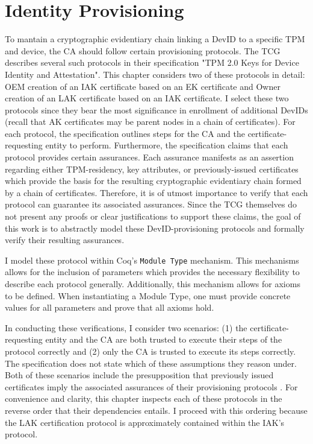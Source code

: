 \chapter{Identity Provisioning}



To mantain a cryptographic evidentiary chain linking a DevID to a specific TPM and device, the CA should follow certain provisioning protocols. The TCG describes several such protocols in their specification "TPM 2.0 Keys for Device Identity and Attestation". This chapter considers two of these protocols in detail: OEM creation of an IAK certificate based on an EK certificate and Owner creation of an LAK certificate based on an IAK certificate. I select these two protocols since they bear the most significance in enrollment of additional DevIDs (recall that AK certificates may be parent nodes in a chain of certificates). For each protocol, the specification outlines steps for the CA and the certificate-requesting entity to perform.
Furthermore, the specification claims that each protocol provides certain assurances. Each assurance manifests as an assertion regarding either TPM-residency, key attributes, or previously-issued certificates which provide the basis for the resulting cryptographic evidentiary chain formed by a chain of certificates. Therefore, it is of utmost importance to verify that each protocol can guarantee its associated assurances.
Since the TCG themselves do not present any proofs or clear justifications to support these claims, the goal of this work is to abstractly model these DevID-provisioning protocols and formally verify their resulting assurances.


I model these protocol within Coq's \verb|Module Type| mechanism. This mechanisms allows for the inclusion of parameters which provides the necessary flexibility to describe each protocol generally. Additionally, this mechanism allows for axioms to be defined. When instantiating a Module Type, one must provide concrete values for all parameters and prove that all axioms hold.

In conducting these verifications, I consider two scenarios: (1) the certificate-requesting entity and the CA are both trusted to execute their steps of the protocol correctly and (2) only the CA is trusted to execute its steps correctly. The specification does not state which of these assumptions they reason under. 
Both of these scenarios include the presupposition that previously issued certificates imply the associated assurances of their provisioning protocols .
For convenience and clarity, this chapter inspects each of these protocols in the reverse order that their dependencies entails. I proceed with this ordering because the LAK certification protocol is approximately contained within the IAK's protocol. 



